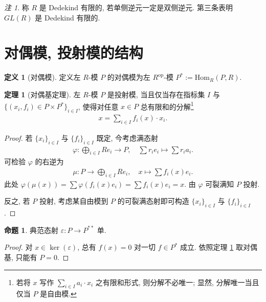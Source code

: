 \documentclass{MainStyle}
\theoremstyle{definition}
\theoremstyle{definition}
\theoremstyle{definition}
\newtheorem{definition}{定义}
\theoremstyle{definition}
\newtheorem{proposition}{命题}
\theoremstyle{definition}
\theoremstyle{definition}
\theoremstyle{definition}
\newtheorem{theorem}{定理}
\theoremstyle{remark}
\newtheorem{remark}{注}
\theoremstyle{remark}
\begin{document}
\begin{remark}
    称 $R$ 是 Dedekind 有限的, 若单侧逆元一定是双侧逆元. 第三条表明 $GL(R)$ 是 Dedekind 有限的.
\end{remark}

\section{对偶模, 投射模的结构}

\begin{definition}[对偶模]
    定义左 $R$-模 $P$ 的对偶模为左 $R^{\mathrm{op}}$-模 $P^\ast:=\mathrm{Hom}_R(P,R)$.
\end{definition}

\begin{theorem}[对偶基定理]\label{dual-basis}
    左 $R$-模 $P$ 是投射模, 当且仅当存在指标集 $I$ 与 $\{(x_i,f_i)\in P\times P^\ast \}_{i\in I}$, 使得对任意 $x\in P$ 总有限和的分解\footnote{若将 $x$ 写作 $\sum_{i\in I}a_i \cdot x_i$ 之有限和形式, 则分解不必唯一; 显然, 分解唯一当且仅当 $P$ 是自由模.}
    \begin{align*}
        x=\sum_{i\in I}f_i(x)\cdot x_i.
    \end{align*}
    \begin{proof}
        若 $\{x_i\}_{i\in I}$ 与 $\{f_i\}_{i\in I}$ 既定, 今考虑满态射
        \begin{align*}
            \varphi: \bigoplus_{i\in I}Re_i\to P, \quad \sum r_i e_i\mapsto \sum r_i a_i.
        \end{align*}
        可检验 $\varphi$ 的右逆为
        \begin{align*}
            \mu:P\to \bigoplus_{i\in I}Re_i,\quad x\mapsto \sum f_i(x)e_i.
        \end{align*}
        此处 $\varphi(\mu(x))=\sum \varphi(f_i(x)e_i)=\sum f_i(x)e_i=x$. 由 $\varphi$ 可裂满知 $P$ 投射. \par
        反之, 若 $P$ 投射, 考虑某自由模到 $P$ 的可裂满态射即可构造 $\{x_i\}_{i\in I}$ 与 $\{f_i\}_{i\in I}$.
    \end{proof}
\end{theorem}

\begin{proposition}
    典范态射 $\varepsilon: P\to P^{\ast\ast}$ 单.
    \begin{proof}
        对 $x\in \ker(\varepsilon)$, 总有 $f(x)= 0$ 对一切 $f\in P^\ast$ 成立. 依照定理 \ref{dual-basis} 取对偶基, 只能有 $P=0$.
    \end{proof}
\end{proposition}
\end{document}
